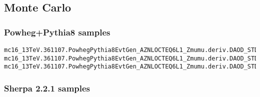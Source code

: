\subsection{Monte Carlo}

\subsubsection{Powheg+Pythia8 samples}

\begin{tiny}
\begin{verbatim}
mc16_13TeV.361107.PowhegPythia8EvtGen_AZNLOCTEQ6L1_Zmumu.deriv.DAOD_STDM7.e3601_s3126_r9364_p4145
mc16_13TeV.361107.PowhegPythia8EvtGen_AZNLOCTEQ6L1_Zmumu.deriv.DAOD_STDM7.e3601_s3126_r10201_p4145
mc16_13TeV.361107.PowhegPythia8EvtGen_AZNLOCTEQ6L1_Zmumu.deriv.DAOD_STDM7.e3601_s3126_r10724_p4145
\end{verbatim}
\end{tiny}

\subsubsection{Sherpa 2.2.1 samples}

